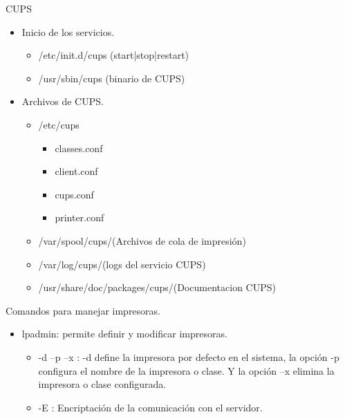 \documentclass{beamer}
\begin{document}
\begin{frame}{CUPS}

\begin{itemize}
\item Inicio de los servicios.
	\begin{itemize}
		\item /etc/init.d/cups (start|stop|restart)
		\item /usr/sbin/cups (binario de CUPS)
	\end{itemize}
\item Archivos de CUPS.
	\begin{itemize}
		\item /etc/cups
			\begin{itemize}
				\item classes.conf
				\item client.conf	
				\item cups.conf
				\item printer.conf
			\end{itemize}
		\item /var/spool/cups/(Archivos de cola de impresión)
		\item /var/log/cups/(logs del servicio CUPS)
		\item /usr/share/doc/packages/cups/(Documentacion CUPS)
	\end{itemize}
\end{itemize}
\end{frame}

\begin{frame}{Comandos para manejar impresoras.}
\begin{itemize}
\item lpadmin:  permite definir y modificar impresoras.
	\begin{itemize}
		\item -d –p –x :  -d define la impresora por defecto en el sistema, la opción  -p configura el nombre de la impresora o clase. Y la opción –x elimina la impresora o clase configurada.
		\item -E : Encriptación de la comunicación con el servidor.
	\end{itemize}
\end{itemize}
\end{frame}
\end{document}
